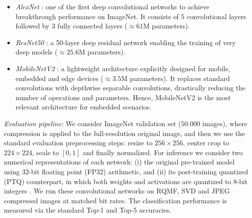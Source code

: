 \documentclass[lettersize,journal]{IEEEtran}
\begin{document}
\begin{itemize}
\item \textit{AlexNet} \cite{alexnet}: one of the first deep convolutional networks to achieve breakthrough performance on ImageNet. It consists of 5 convolutional layers followed by 3 fully connected layers ($\approx 61$M parameters).%

\item \textit{ResNet50} \cite{resnet}: a 50-layer deep residual network %
enabling the training of very deep models ($\approx 25.6$M parameters). %

\item \textit{MobileNetV2} \cite{mobilenetv2}: a lightweight architecture explicitly designed for mobile, embedded and edge devices ($\approx 3.5$M parameters). It replaces standard convolutions with depthwise separable convolutions, 
drastically reducing the number of operations and parameters. 
Hence, MobileNetV2 is the most relevant architecture for  embedded scenarios.%
\end{itemize}


\noindent \textit{Evaluation pipeline:}  We consider  ImageNet validation set ($50.000$ images), where compression  is applied to the full-resolution original image, and  then we use the standard evaluation preprocessing steps: resize to $256 \times 256$, center crop to $224 \times 224$,  scale to $[0, 1]$ and finally normalized. For inference we consider two numerical representations of each network: (i) the original pre-trained model using $32$-bit floating point (FP32) arithmetic, and (ii) its post-training quantized (PTQ) counterpart, in which both weights and activations are quantized to $8$-bit integers \cite{gholami2022survey, wang2022niti}. We  run these convolutional networks on RQMF, SVD and JPEG compressed images at matched bit rates. The classification performance is measured via the standard Top-1 and Top-5 accuracies.\\
\end{document}
